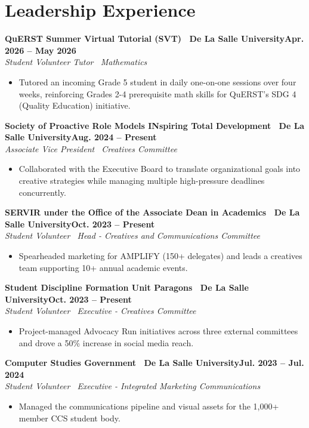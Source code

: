 \documentclass[10.5pt, letterpaper]{article}
\newcommand{\entry}[3]{%
    \par\noindent
    {\textbf{#1}\hfill\textbf{#2}}\\
    {\textit{#3}}\par\vspace{0.05em}
}
\begin{document}
\section{Leadership Experience}

\entry{QuERST Summer Virtual Tutorial (SVT) \textbar\ De La Salle University}{Apr. 2026 -- May 2026}{Student Volunteer Tutor \textbar\ Mathematics}
\begin{itemize}
    \item Tutored an incoming Grade 5 student in daily one-on-one sessions over four weeks, reinforcing Grades 2-4 prerequisite math skills for QuERST's SDG 4 (Quality Education) initiative.
\end{itemize}

\entry{Society of Proactive Role Models INspiring Total Development \textbar\ De La Salle University}{Aug. 2024 -- Present}{Associate Vice President \textbar\ Creatives Committee}
\begin{itemize}
    \item Collaborated with the Executive Board to translate organizational goals into creative strategies while managing multiple high-pressure deadlines concurrently.
\end{itemize}

\entry{SERVIR under the Office of the Associate Dean in Academics \textbar\ De La Salle University}{Oct. 2023 -- Present}{Student Volunteer \textbar\ Head - Creatives and Communications Committee}
\begin{itemize}
    \item Spearheaded marketing for AMPLIFY (150+ delegates) and leads a creatives team supporting 10+ annual academic events.
\end{itemize}

\entry{Student Discipline Formation Unit Paragons \textbar\ De La Salle University}{Oct. 2023 -- Present}{Student Volunteer \textbar\ Executive - Creatives Committee}
\begin{itemize}
    \item Project-managed Advocacy Run initiatives across three external committees and drove a 50\% increase in social media reach.
\end{itemize}

\entry{Computer Studies Government \textbar\ De La Salle University}{Jul. 2023 -- Jul. 2024}{Student Volunteer \textbar\ Executive - Integrated Marketing Communications}
\begin{itemize}
    \item Managed the communications pipeline and visual assets for the 1,000+ member CCS student body.
\end{itemize}
\end{document}
